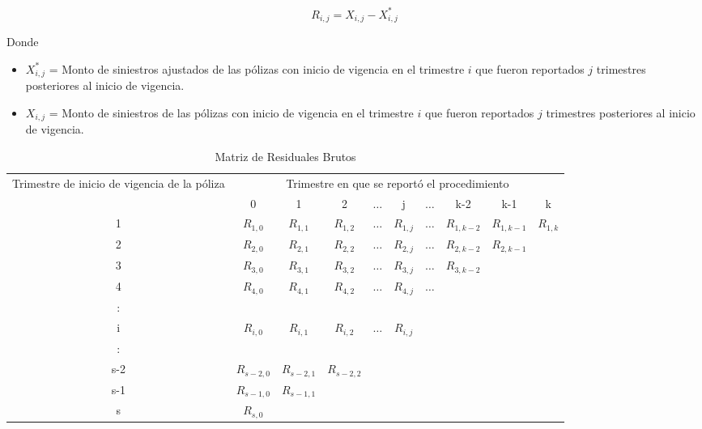 \documentclass[11pt,twoside,openright,spanish]{report}
\numberwithin{equation}{chapter}
\numberwithin{figure}{chapter}
\numberwithin{table}{chapter}
\begin{document}
	\begin{equation}
	R_{i,j}^{}= X_{i,j}^{} - X_{i,j}^{*} 
	\label{eq7}
	\end{equation}
	
	Donde 
	
	\begin{itemize}
			\setlength\itemsep{-0.5em}
		\item ${X}_{i,j}^{*}$ = Monto de siniestros ajustados de las pólizas con inicio de vigencia en el trimestre $i$ que fueron reportados $j$ trimestres posteriores al inicio de vigencia.
		\item ${X}_{i,j}$ = Monto de siniestros de las pólizas con inicio de vigencia en el trimestre $i$ que fueron reportados $j$ trimestres posteriores al inicio de vigencia.		
		\end{itemize}
		

	\begin{table}[ht]
		\centering
		\begin{tabularx}{\linewidth}{ c|ccccccccc}
			\multirow{2}{4cm}{Trimestre de inicio de vigencia de la póliza}
			& \multicolumn{9}{c}{Trimestre en que se reportó el procedimiento} \\
			& 0  & 1 & 2 & $ \dots $ & j & $\dots $ & k-2 & k-1 &  k \\
			\midrule
			1      &  $R_{1,0}^{ }$ & $R_{1,1}^{ }$ & $R_{1,2}^{ }$ & $ \dots $ & $R_{1,j}^{ }$ & $ \dots $ & $R_{1,k-2}^{ }$ & $R_{1,k-1}^{ }$ & $R_{1,k}^{ }$ \\
			2      &  $R_{2,0}^{ }$ & $R_{2,1}^{ }$ & $R_{2,2}^{ }$ & $ \dots $ & $R_{2,j}^{ }$ & $ \dots $ & $R_{2,k-2}^{ }$ & $R_{2,k-1}^{ }$ & \\
			3      &  $R_{3,0}^{ }$ & $R_{3,1}^{ }$ & $R_{3,2}^{ }$ & $ \dots $ & $R_{3,j}^{ }$ & $ \dots $ & $R_{3,k-2}^{ }$ & & \\
			4      &  $R_{4,0}^{ }$ & $R_{4,1}^{ }$ & $R_{4,2}^{ }$ & $ \dots $ & $R_{4,j}^{ }$ & $ \dots $ & & & \\
			:      & & & & & & & & & \\
			i      &  $R_{i,0}^{ }$ & $R_{i,1}^{ }$ & $R_{i,2}^{ }$ & $ \dots $ & $R_{i,j}^{ }$ & & & & \\
			:      & & & & & & & & & \\
			s-2      &  $R_{s-2,0}^{ }$ & $R_{s-2,1}^{ }$ & $R_{s-2,2}^{ }$ & & & & & & \\
			s-1      &  $R_{s-1,0}^{ }$ & $R_{s-1,1}^{ }$ & & & & & & & \\
			s      &  $R_{s,0}^{ }$ & & & & & & & & \\
		\end{tabularx}
	\caption{Matriz de Residuales Brutos}
	\label{matrix5}
	\end{table}
 
\end{document}
